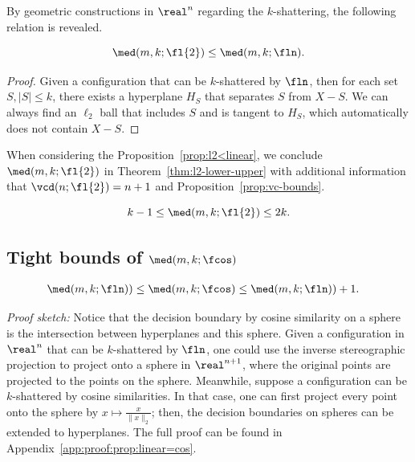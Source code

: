 By geometric constructions in $\real^n$ regarding the $k$-shattering, the following relation is revealed.

\begin{proposition}\label{prop:l2<linear}

$$\med(m, k; \fl{2}) \leq \med(m, k; \fln). $$

\end{proposition}
\begin{proof}
Given a configuration that can be $k$-shattered by $\fln$, then for each set $S, |S| \leq k$, there exists a hyperplane $H_S$ that separates $S$ from $X-S$. We can always find an $\ell_2$ ball that includes $S$ and is tangent to $H_S$, which automatically does not contain $X-S$.
\end{proof}
When considering the Proposition~\ref{prop:l2<linear}, we conclude $\med(m, k;\fl{2})$ in Theorem~\ref{thm:l2-lower-upper} with additional information that $\vcd(n;\fl{2}) = n+1$ and Proposition~\ref{prop:vc-bounds}.

\begin{theorem}\label{thm:l2-lower-upper}
    $$k-1\leq \med(m, k; \fl{2}) \leq 2k.$$
\end{theorem}

\subsection{Tight bounds of $\med(m, k; \fcos)$}

\begin{proposition}\label{prop:linear=cos}
\begin{align*}
    \med(m, k; \fln)) &\leq \med(m, k; \fcos) \leq \med(m, k; \fln)) + 1.
\end{align*}
\end{proposition}
\noindent\textit{Proof sketch:} Notice that the decision boundary by cosine similarity on a sphere is the intersection between hyperplanes and this sphere. Given a configuration in $\real^n$ that can be $k$-shattered by $\fln$, one could use the inverse stereographic projection to project onto a sphere in $\real^{n+1}$, where the original points are projected to the points on the sphere. Meanwhile, suppose a configuration can be $k$-shattered by cosine similarities. In that case, one can first project every point onto the sphere by $x\mapsto \frac{x}{\|x\|_2}$; then, the decision boundaries on spheres can be extended to hyperplanes. The full proof can be found in Appendix~\ref{app:proof:prop:linear=cos}.

